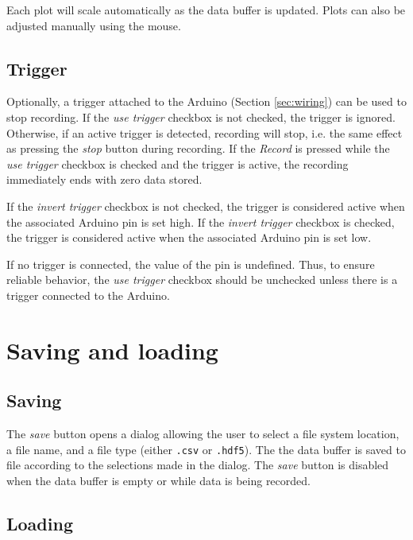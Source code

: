 \documentclass[11pt,letterpaper,article,oneside]{memoir}
\newcommand{\csv}{\texttt{.csv}}
\newcommand{\hdf}{\texttt{.hdf5}}
\begin{document}
Each plot will scale automatically as the data buffer is updated. Plots can also
be adjusted manually using the mouse.



\section{Trigger}
\label{sec:trigger}

Optionally, a trigger attached to the Arduino (Section \ref{sec:wiring}) can be
used to stop recording.  If the \emph{use trigger} checkbox is not checked, the
trigger is ignored. Otherwise, if an active trigger is detected, recording will
stop, i.e. the same effect as pressing the \emph{stop} button during recording.
If the \emph{Record} is pressed while the \emph{use trigger} checkbox is checked
and the trigger is active, the recording immediately ends with zero data stored.

If the \emph{invert trigger} checkbox is not checked, the trigger is considered
active when the associated Arduino pin is set high. If the \emph{invert trigger}
checkbox is checked, the trigger is considered active when the associated
Arduino pin is set low.

If no trigger is connected, the value of the pin is undefined.  Thus, to ensure
reliable behavior, the \emph{use trigger} checkbox should be unchecked unless
there is a trigger connected to the Arduino.



\chapter{Saving and loading}
\label{sec:savingloading}


\section{Saving}

The \emph{save} button opens a dialog allowing the user to select a file system
location, a file name, and a file type (either \csv{} or \hdf{}).  The the data
buffer is saved to file according to the selections made in the dialog. The
\emph{save} button is disabled when the data buffer is empty or while data is
being recorded.

\section{Loading}
\end{document}
